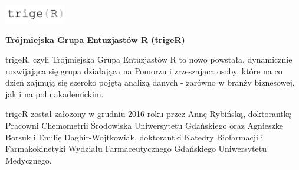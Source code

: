 \documentclass[\main/boa.tex]{subfiles}
\begin{document}
	
	\begin{minipage}[t]{0.915\textwidth}
		\center     
		\includegraphics[width=100px]{img/logos.bw/triger3.png} 
	\end{minipage}
	
	\Large \textbf {Trójmiejska Grupa Entuzjastów R (trigeR)}
	
	
	\vskip 0.3cm
	\normalsize 


trigeR, czyli Trójmiejska Grupa Entuzjastów R to nowo powstała, dynamicznie rozwijająca się grupa działająca na Pomorzu i zrzeszająca osoby, które na co dzień zajmują się szeroko pojętą analizą danych - zarówno w branży biznesowej, jak i na polu akademickim.

trigeR został założony w grudniu 2016 roku przez Annę Rybińską, doktorantkę Pracowni Chemometrii Środowiska Uniwersytetu Gdańskiego oraz Agnieszkę Borsuk i Emilię Daghir-Wojtkowiak, doktorantki Katedry Biofarmacji i Farmakokinetyki Wydziału Farmaceutycznego Gdańskiego Uniwersytetu Medycznego.
	
	\vskip 1.5cm
\end{document}
